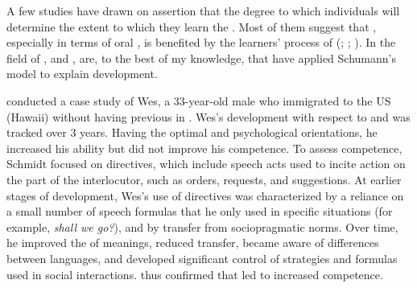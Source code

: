 \documentclass[output=paper]{langsci/langscibook}
\begin{document}
A few studies have drawn on  assertion that the degree to which individuals  will determine the extent to which they learn the . Most of them suggest that  , especially in terms of oral , is benefited by the learners’ process of  (\citealt{Hansen1995}; \citealt{Lybeck2002}; \citealt{JiangEtAl2009}). In the field of ,  and \cite{DörnyeiEtAl2004}, are, to the best of my knowledge, that have applied Schumann’s model to explain   development.

\citet{Schmidt1983} conducted a case study of Wes, a 33-year-old  male who immigrated to the US (Hawaii) without having previous  in . Wes’s development with respect to  and   was tracked over 3 years. Having the optimal  and psychological orientations, he increased his  ability but did not improve his  competence. To assess  competence, Schmidt focused on directives, which include speech acts used to incite action on the part of the interlocutor, such as orders, requests, and suggestions. At earlier stages of  development, Wes’s use of directives was characterized by a reliance on a small number of speech formulas that he only used in specific situations (for example, \textit{shall we go?}), and by transfer from  sociopragmatic norms. Over time, he improved the  of meanings, reduced  transfer, became aware of differences between languages, and developed significant control of  strategies and formulas used in social interactions. \cite{Schmidt1983} thus confirmed that  led to increased   competence.
\end{document}
